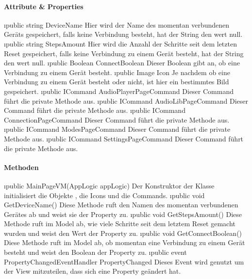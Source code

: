 \documentclass[../entwurf.tex]{subfiles}
\begin{document}
\paragraph{Attribute \& Properties}
\begin{itemize}
	\i{public string DeviceName} Hier wird der Name des momentan verbundenen Geräts gespeichert, falls keine Verbindung besteht, hat der String den wert null.
	\i{public string StepsAmount} Hier wird die Anzahl der Schritte seit dem letzten Reset gespeichert, falls keine Verbindung zu einem Gerät besteht, hat der String den wert null.
	\i{public Boolean ConnectBoolean} Dieser Boolean gibt an, ob eine Verbindung zu einem Gerät besteht.
	\i{public Image Icon} Je nachdem ob eine Verbindung zu einem Gerät besteht oder nicht, ist hier ein bestimmtes Bild gespeichert.
	\i{public ICommand AudioPlayerPageCommand} Dieser Command führt die private Methode  aus. 
	\i{public ICommand AudioLibPageCommand} Dieser Command führt die private Methode  aus. 
	\i{public ICommand ConnectionPageCommand} Dieser Command führt die private Methode  aus. 
	\i{public ICommand ModesPageCommand} Dieser Command führt die private Methode  aus. 
	\i{public ICommand SettingsPageCommand} Dieser Command führt die private Methode  aus. 
\end{itemize}
\paragraph{Methoden}
\begin{itemize}
	\i{public MainPageVM(AppLogic appLogic)} Der Konstruktor der Klasse initialisiert die Objekte , die Icons und die Commands.
	\i{public void GetDeviceName()} Diese Methode ruft den Namen des momentan verbundenen Gerätes ab und weist sie der Property  zu.
	\i{public void GetStepsAmount()} Diese Methode ruft im Model ab, wie viele Schritte seit dem letztem Reset gemacht wurden und weist den Wert der Property  zu.
	\i{public void GetConnectBoolean()} Diese Methode ruft im Model ab, ob momentan eine Verbindung zu einem Gerät besteht und weist den Boolean der Property  zu.
	\i{public event PropertyChangedEventHandler PropertyChanged} Dieses Event wird genutzt um der View mitzuteilen, dass sich eine Property geändert hat.
\end{itemize}
\end{document}
